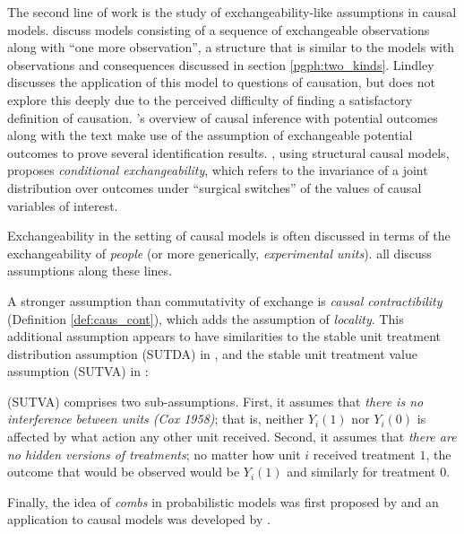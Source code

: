 The second line of work is the study of exchangeability-like assumptions in causal models. \citet{lindley_role_1981} discuss models consisting of a sequence of exchangeable observations along with ``one more observation'', a structure that is similar to the models with observations and consequences discussed in section \ref{pgph:two_kinds}. Lindley discusses the application of this model to questions of causation, but does not explore this deeply due to the perceived difficulty of finding a satisfactory definition of causation. \citet{rubin_causal_2005}'s overview of causal inference with potential outcomes along with the text \citet{imbens_causal_2015} make use of the assumption of exchangeable potential outcomes to prove several identification results. \citet{saarela_role_2020}, using structural causal models, proposes \emph{conditional exchangeability}, which refers to the invariance of a joint distribution over outcomes under ``surgical switches'' of the values of causal variables of interest.

Exchangeability in the setting of causal models is often discussed in terms of the exchangeability of \emph{people} (or more generically, \emph{experimental units}). \citet{hernan_beyond_2012,greenland_identifiability_1986,banerjee_chapter_2017,dawid_decision-theoretic_2020} all discuss assumptions along these lines.

A stronger assumption than commutativity of exchange is \emph{causal contractibility} (Definition \ref{def:caus_cont}), which adds the assumption of \emph{locality}. This additional assumption appears to have similarities to the stable unit treatment distribution assumption (SUTDA) in \citet{dawid_decision-theoretic_2020}, and the stable unit treatment value assumption (SUTVA) in \citep{rubin_causal_2005}:
\begin{blockquote}
(SUTVA) comprises two sub-assumptions. First, it assumes that \emph{there is no interference between units (Cox 1958)}; that is, neither $Y_i(1)$ nor $Y_i(0)$ is affected by what action any other unit received. Second, it assumes that \emph{there are no hidden versions of treatments}; no matter how unit $i$ received treatment $1$, the outcome that would be observed would be $Y_i(1)$ and similarly for treatment $0$.
\end{blockquote}

Finally, the idea of \emph{combs} in probabilistic models was first proposed by \citet{chiribella_quantum_2008} and an application to causal models was developed by \citet{jacobs_causal_2019}.

